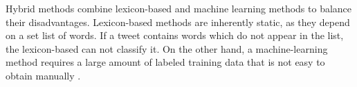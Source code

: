 Hybrid methods combine lexicon-based and machine learning methods to balance their disadvantages. Lexicon-based methods are inherently static, as they depend on a set list of words. If a tweet contains words which do not appear in the list, the lexicon-based can not classify it. On the other hand, a machine-learning method requires a large amount of labeled training data that is not easy to obtain manually \cite{DBLP:journals/csur/GiachanouC16}.







